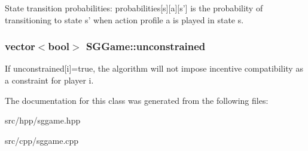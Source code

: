 State transition probabilities\-: probabilities\mbox{[}s\mbox{]}\mbox{[}a\mbox{]}\mbox{[}s'\mbox{]} is the probability of transitioning to state s' when action profile a is played in state s. \hypertarget{classSGGame_a528852e11bd68322535d7f24a41eca20}{
\subsubsection[{unconstrained}]{\setlength{\rightskip}{0pt plus 5cm}vector$<$bool$>$ S\-G\-Game\-::unconstrained\hspace{0.3cm}{\ttfamily [private]}}}\label{classSGGame_a528852e11bd68322535d7f24a41eca20}
If unconstrained\mbox{[}i\mbox{]}=true, the algorithm will not impose incentive compatibility as a constraint for player i. 

The documentation for this class was generated from the following files\-:\begin{DoxyCompactItemize}
\item 
src/hpp/sggame.\-hpp\item 
src/cpp/sggame.\-cpp\end{DoxyCompactItemize}
